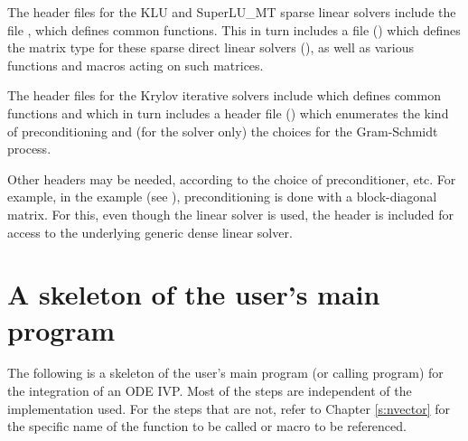 The header files for the KLU and SuperLU\_MT sparse linear solvers
include the file , which defines common functions.
This in turn includes a file () which defines
the matrix type for these sparse direct linear solvers (),
as well as various functions and macros acting on such matrices.

The header files for the Krylov iterative solvers include 
which defines common functions and which in turn includes a header file ()
which enumerates the kind of preconditioning and (for the {\spgmr} solver only) 
the choices for the Gram-Schmidt process.

Other headers may be needed, according to the choice of
preconditioner, etc.  For example, in the 
example (see \cite{cvode_ex}), preconditioning is done with a
block-diagonal matrix. For this, even though the {\cvspgmr} linear
solver is used, the header  is included for
access to the underlying generic dense linear solver.

\section{A skeleton of the user's main program}\label{ss:skeleton_sim}

The following is a skeleton of the user's main program (or calling
program) for the integration of an ODE IVP. Most of the steps are
independent of the {\nvector} implementation used.  For the steps that
are not, refer to Chapter \ref{s:nvector} for the specific name of the
function to be called or macro to be referenced.

